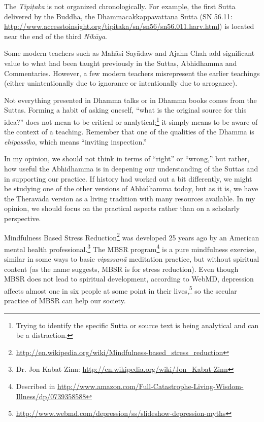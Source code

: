 
The \textit{Tipiṭaka} is not organized chronologically. For example, the first Sutta delivered by the Buddha, the Dhammacakkappavattana Sutta (SN 56.11: \url{http://www.accesstoinsight.org/tipitaka/sn/sn56/sn56.011.harv.html}) is located near the end of the third \textit{Nikāya}.


Some modern teachers such as Mahāsi Sayādaw and Ajahn Chah add significant value to what had been taught previously in the Suttas, Abhidhamma and Commentaries. However, a few modern teachers misrepresent the earlier teachings (either unintentionally due to ignorance or intentionally due to arrogance).

Not everything presented in Dhamma talks or in Dhamma books comes from the Suttas. Forming a habit of asking oneself, “what is the original source for this idea?” does not mean to be critical or analytical;\footnote{Trying to identify the specific Sutta or source text is being analytical and can be a distraction.} it simply means to be aware of the context of a teaching. Remember that one of the qualities of the Dhamma is \textit{ehipassiko}, which means “inviting inspection.” 


In my opinion, we should not think in terms of “right” or “wrong,” but rather, how useful the Abhidhamma is in deepening our understanding of the Suttas and in supporting our practice. If history had worked out a bit differently, we might be studying one of the other versions of Abhidhamma today, but as it is, we have the Theravāda version as a living tradition with many resources available. In my opinion, we should focus on the practical aspects rather than on a scholarly perspective.


Mindfulness Based Stress Reduction\footnote{\url{http://en.wikipedia.org/wiki/Mindfulness-based_stress_reduction}} was developed 25 years ago by an American mental health professional.\footnote{Dr. Jon Kabat-Zinn: \url{http://en.wikipedia.org/wiki/Jon_Kabat-Zinn}} The MBSR program\footnote{Described in \url{http://www.amazon.com/Full-Catastrophe-Living-Wisdom-Illness/dp/0739358588}} is a pure mindfulness exercise, similar in some ways to basic \textit{vipassanā} meditation practice, but without spiritual content (as the name suggests, MBSR is for stress reduction). Even though MBSR does not lead to spiritual development, according to WebMD, depression affects almost one in six people at some point in their lives,\footnote{\url{http://www.webmd.com/depression/ss/slideshow-depression-myths}} so the secular practice of MBSR can help our society. 


